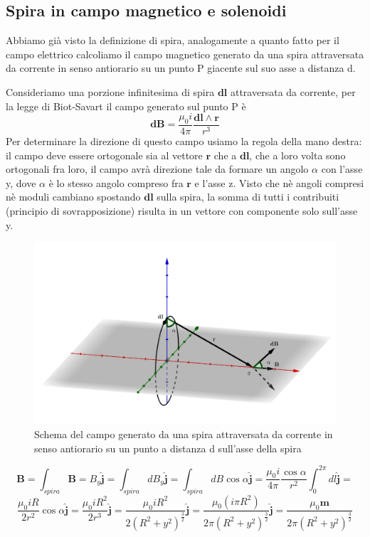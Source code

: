 \documentclass[
10pt, %
a4paper, %
oneside, %
headinclude,footinclude, %
BCOR5mm, %
]{scrartcl}
\begin{document}
\subsection{Spira in campo magnetico e solenoidi}
Abbiamo già visto la definizione di spira, analogamente a quanto fatto per il campo elettrico calcoliamo il campo magnetico generato da una spira attraversata da corrente in senso antiorario su un punto P giacente sul suo asse a distanza d. 
\begin{esercizio}
Consideriamo una porzione infinitesima di spira \(\mathbf{dl}\) attraversata da corrente, per la legge di Biot-Savart il campo generato sul punto P è
\[\mathbf{dB}=\frac{\mu_0 i}{4\pi}\frac{\mathbf{dl}\wedge\mathbf{r}}{r^3}\]
Per determinare la direzione di questo campo usiamo la regola della mano destra: il campo deve essere ortogonale sia al vettore \(\mathbf{r}\) che a \(\mathbf{dl}\), che a loro volta sono ortogonali fra loro, il campo avrà direzione tale da formare un angolo $\alpha$ con l'asse y, dove $\alpha$ è lo stesso angolo compreso fra \(\mathbf{r}\) e l'asse z. Visto che nè angoli compresi nè moduli cambiano spostando \(\mathbf{dl}\) sulla spira, la somma di tutti i contribuiti (principio di sovrapposizione) risulta in un vettore con componente solo sull'asse y. 
\begin{figure}[h!]
	\centering
	\includegraphics[width=0.7\linewidth]{../images/campo_magnetico_spira}
	\caption{Schema del campo generato da una spira attraversata da corrente in senso antiorario su un punto a distanza d sull'asse della spira}
	\label{fig:campomagneticospira}
\end{figure}
\FloatBarrier
\[\mathbf{B}=\int_{spira}\mathbf{B}= B_y\mathbf{\hat{j}}=\int_{spira}dB_y\mathbf{\hat{j}}=\int_{spira}dB\cos\alpha\mathbf{\hat{j}}=\frac{\mu_0 i}{4\pi}\frac{\cos\alpha}{r^2}\int_{0}^{2\pi}dl\mathbf{\hat{j}}=\]
\[\frac{\mu_0 i R}{2r^2}\cos\alpha \mathbf{\hat{j}}=\frac{\mu_0 i R^2}{2r^3} \mathbf{\hat{j}}=\frac{\mu_0 i R^2}{2(R^2+y^2)^{\frac{3}{2}}} \mathbf{\hat{j}}=\frac{\mu_0 (i \pi R^2)}{2\pi(R^2+y^2)^{\frac{3}{2}}} \mathbf{\hat{j}}=\frac{\mu_0 \mathbf{m}}{2\pi(R^2+y^2)^{\frac{3}{2}}}\]

\end{esercizio}
\end{document}
